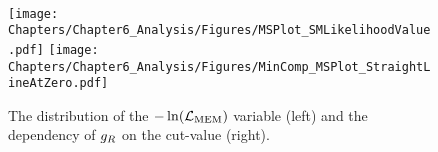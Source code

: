 \\
\begin{figure}[h!t]
 \centering
 \texttt{[image: Chapters/Chapter6\_Analysis/Figures/MSPlot\_SMLikelihoodValue.pdf]} \hspace{0.2cm}
 \texttt{[image: Chapters/Chapter6\_Analysis/Figures/MinComp\_MSPlot\_StraightLineAtZero.pdf]}   %
 \caption{The distribution of the $-\ln(\mathcal{L}_{\textrm{MEM}})$ variable (left) and the dependency of $g_{R}$ on the cut-value (right).} 
 \label{fig::CutValue}
\end{figure}




